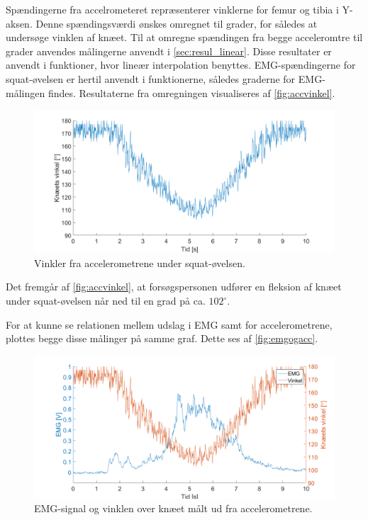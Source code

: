 Spændingerne fra accelrometeret repræsenterer vinklerne for femur og tibia i Y-aksen. Denne spændingsværdi ønskes omregnet til grader, for således at undersøge vinklen af knæet. Til at omregne spændingen fra begge acceleromtre til grader anvendes målingerne anvendt i \autoref{sec:resul_linear}. Disse resultater er anvendt i funktioner, hvor lineær interpolation benyttes. EMG-spændingerne for squat-øvelsen er hertil anvendt i funktionerne, således graderne for EMG-målingen findes.
Resultaterne fra omregningen visualiseres af \autoref{fig:accvinkel}. 

\begin{figure}[H]
	\centering
	\includegraphics[width=1\textwidth]{figures/Pilotforsoeg/accvinkel}
	\caption{Vinkler fra accelerometrene under squat-øvelsen.}
	\label{fig:accvinkel}
\end{figure}

\noindent
Det fremgår af \autoref{fig:accvinkel}, at forsøgspersonen udfører en fleksion af knæet under squat-øvelsen når ned til en grad på ca. $102^{\circ}$. 

For at kunne se relationen mellem udslag i EMG samt for accelerometrene, plottes begge disse målinger på samme graf. Dette ses af \autoref{fig:emgogacc}. 
\begin{figure}[H]
	\centering
	\includegraphics[width=1\textwidth]{figures/Pilotforsoeg/emg_vinkler_tid}
	\caption{EMG-signal og vinklen over knæet målt ud fra accelerometrene.}
	\label{fig:emgogacc}
\end{figure}

